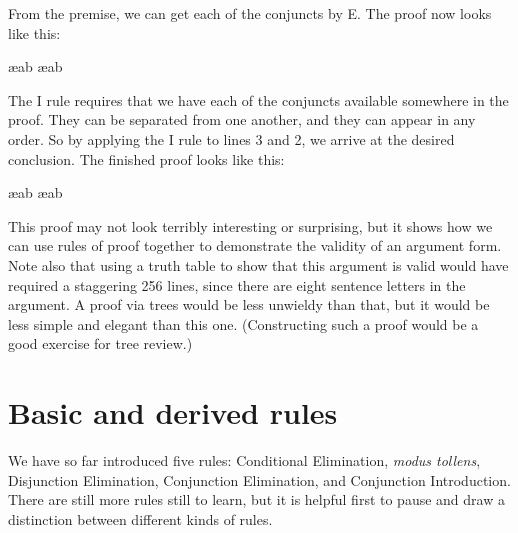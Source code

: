 \begin{ndproof}
\end{ndproof}

From the premise, we can get each of the conjuncts by {\eand}E. The proof now looks like this:

\begin{ndproof}
	 \ae{ab}
	 \ae{ab}
\end{ndproof}

The {\eand}I rule requires that we have each of the conjuncts available somewhere in the proof. They can be separated from one another, and they can appear in any order. So by applying the {\eand}I rule to lines 3 and 2, we arrive at the desired conclusion. The finished proof looks like this:

\begin{ndproof}

	 \ae{ab}
	 \ae{ab}
	 
\end{ndproof}

This proof may not look terribly interesting or surprising, but it shows how we can use rules of proof together to demonstrate the validity of an argument form. Note also that using a truth table to show that this argument is valid would have required a staggering 256 lines, since there are eight sentence letters in the argument. A proof via trees would be less unwieldy than that, but it would be less simple and elegant than this one. (Constructing such a proof would be a good exercise for tree review.)


\section{Basic and derived rules}
\label{sec:basic}

We have so far introduced five rules: Conditional Elimination, \emph{modus tollens}, Disjunction Elimination, Conjunction Elimination, and Conjunction Introduction. There are still more rules still to learn, but it is helpful first to pause and draw a distinction between different kinds of rules.

